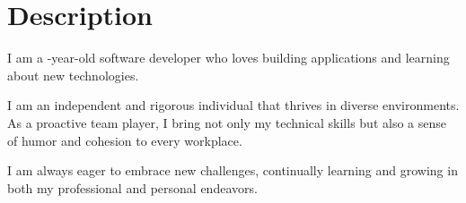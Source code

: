 
\section{Description}
\begin{mySectionContents}
\begin{FlushLeft} %

I am a \myAgeFloor-year-old software developer who loves building applications and learning about new technologies.

I am an independent and rigorous individual that thrives in diverse environments. As a proactive team player, I bring not only my technical skills but also a sense of humor and cohesion to every workplace.

I am always eager to embrace new challenges, continually learning and growing in both my professional and personal endeavors.


\end{FlushLeft}
\end{mySectionContents}